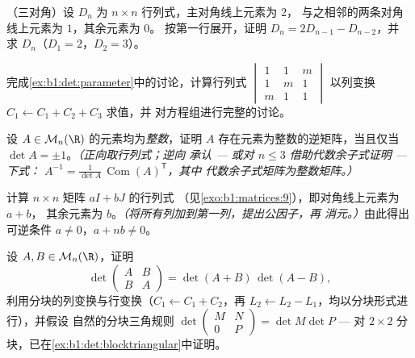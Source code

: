 \begin{exercise}[$\star\star$]\label{exo:b1:det:6}
（三对角）设 $D_n$ 为 $n \times n$ 行列式，主对角线上元素为 $2$，
与之相邻的两条对角线上元素为 $1$，其余元素为 $0$。
按第一行展开，证明 $D_n = 2D_{n-1} - D_{n-2}$，并
求 $D_n$（$D_1 = 2$，$D_2 = 3$）。
\end{exercise}

\begin{exercise}[$\star\star$]\label{exo:b1:det:7}
完成\cref{ex:b1:det:parameter}中的讨论，计算行列式
$\begin{vmatrix} 1 & 1 & m\\ 1 & m & 1\\ m & 1 & 1\end{vmatrix}$
以列变换 $C_1 \leftarrow C_1 + C_2 + C_3$ 求值，并
对方程组进行完整的讨论。
\end{exercise}

\begin{exercise}[$\star\star$]\label{exo:b1:det:8}
设 $A \in \mathcal{M}_n(\R)$ 的元素均为\emph{整数}，证明
$A$ 存在元素为整数的逆矩阵，当且仅当 $\det A
= \pm 1$。\emph{（正向取行列式；逆向
承认 --- 或对 $n \leq 3$ 借助代数余子式证明 --- 下式：
$A^{-1} = \frac{1}{\det A}\,\operatorname{Com}(A)^{\mathsf T}$，其中
代数余子式矩阵为整数矩阵。）}
\end{exercise}

\begin{exercise}[$\star\star\star$]\label{exo:b1:det:9}
计算 $n \times n$ 矩阵 $aI + bJ$ 的行列式
（见\cref{exo:b1:matrices:9}），即对角线上元素为 $a + b$，
其余元素为 $b$。\emph{（将所有列加到第一列，提出公因子，再
消元。）}由此得出可逆条件 $a \neq 0$，$a + nb
\neq 0$。
\end{exercise}

\begin{exercise}[$\star\star\star$]\label{exo:b1:det:10}
设 $A, B \in \mathcal{M}_n(\R)$，证明
\[
\det\begin{pmatrix} A & B\\ B & A \end{pmatrix}
= \det(A + B)\,\det(A - B),
\]
利用分块的列变换与行变换（$C_1 \leftarrow C_1 + C_2$，再
$L_2 \leftarrow L_2 - L_1$，均以分块形式进行），并假设
自然的分块三角规则 $\det\begin{pmatrix} M & N\\ 0 &
P\end{pmatrix} = \det M \det P$ --- 对 $2 \times 2$
分块，已在\cref{ex:b1:det:blocktriangular}中证明。
\end{exercise}

